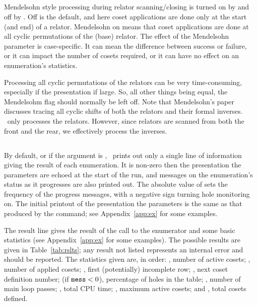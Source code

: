 \subsection{}

Mendelsohn style processing during relator scanning/closing is turned on by
   and off by .
Off is the default, and here coset applications are done only at the start
  (and end) of a relator.
Mendelsohn on means that coset applications are done at all cyclic
  permutations of the (base) relator.
The effect of the Mendelsohn parameter is case-specific.
It can mean the difference between success or failure, or it can impact
  the number of cosets required, or it can have no effect on an
  enumeration's statistics.

Processing all cyclic permutations of the relators can be very
  time-consuming, especially if the presentation if large.
So, all other things being equal, the Mendelsohm flag should normally be
  left off.
Note that Mendelsohn's paper \cite{Men64} discusses tracing all cyclic 
  shifts of both the relators and their formal inverses.
\ace\ only processes the relators.
However, since relators are scanned from both the front and the rear, we
  effectively process the inverses.

\subsection{}

By default, or if the argument is , \ace\ prints out only a single
  line of information giving the result of each enumeration.
It  is non-zero then the presentation \amp the parameters are
  echoed at the start of the run, and messages on the enumeration's status
  as it progresses are also printed out.
The absolute value of  sets the frequency of the progress
  messages, with a negative sign turning hole monitoring on.
The initial printout of the presentation \amp the parameters is the same
  as that produced by the  command; see Appendix~\ref{app:ex}
  for some examples.

The result line gives the result of the call to the enumerator and some
  basic statistics (see Appendix~\ref{app:ex} for some examples).
The possible results are given in Table~\ref{tab:rslts}; any result not
  listed represents an internal error and should be reported.
The statistics given are, in order: 
  , number of active cosets; 
  , number of applied cosets;
  , first (potentially) incomplete row;
  , next coset definition number; 
   (if $\texttt{mess} < 0$), percentage of holes in the table;
  , number of main loop passes;
  , total CPU time;
  , maximum active cosets;
  and , total cosets defined.

